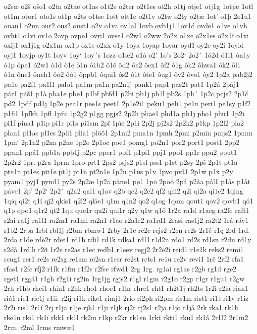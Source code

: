 o2sæ
o2š
ošo1
o2ta
o2tae
ot1as
o1t2e
o2ter
o2t1es
ot2h
o1tj
otje1
otj1g
1otjæ
1otl
ot1m
otor1
oto1s
ot1p
o2ts
o1tse
1ott
ott1e
o2t1v
o2tw
o2ty
o2tæ
1ot'
o1þ
2o1u1
ouan1
o2un
our2
ous2
oust1
o2v
o1va
ov1al
1ovb
ovb1j1
1ov1d
ovde1
o1ve
o1vh
ovht1
o1vi
ov1o
2ovp
ovpe1
ovri1
ovse1
o2w1
o2ww
2o2x
o1xe
o2x1es
o2x1f
o1xi
oxij1
ox1j1g
o2x1m
ox1p
ox1s
o2xx
o1y
1oya
1oyap
1oyar
oyd1
oy2e
oy2i
1oyid
oyj1
1oyjp
oy1t
1oyv
1oy`
1oy´s
1ozz
o1æ2
o1å
o2'
1o's
2o2`
2o2´
1ó2d
ó1i1
ón1y
ó1p
ópe1
ó2w1
ò1d
ò1e
ò1n
ô1b2
ô1č
ôd2
ôe2
ôex1
ôf2
ô1g
ôh2
ôhwa1
ôk2
ôl1
ô1n
ône1
ôneh1
ôo2
ôó1
ôppb1
ôqui1
ôs2
ô1t
ôte1
ôug1
ôv2
ôvo1
ôy2
1p2a
pab2j2
pa1e
pa2f1
pa1l1
palo1
pa1m
pa1n
pa2n1j
pank1
pap1
pas2t
pat1
1p2á
2páj1
pár1
páš1
p1à
pba1e
pbe1
p1bf
pbfd1
p2bi
pb1j
pb1l
pb2s
1pb´
1p2c
pcjs2
2p1č
pd2
1pdf
pd1j
1p2e
pea1r
pee1s
peet1
2p1e2i1
peku1
peli1
pe1n
peri1
pe1sy
p1f2
p1fi1
1pfkh
1pfl
1pfu
1p2g2
p1gg
pgjs2
2p2h
phae1
phd1a
ph1j
pho1
phu1
1p2i
pi1f
pina1
p1ip
pi1r
pi1s
pi1sm
2pï
1pïe
2p1í
2p2j
pj2s2
2p2k2
p1kp
1p2l2
pla2
plan1
pl1as
pl1es
2pli1
plia1
plöö1
2p1m2
pma1n
1pmh
2pmi
p2min
pmjs2
1pmm
1pm`
2p1n2
p2na
p2ne
1p2o
2p1oc
poe1
pomg1
po2n1
por2
port1
post1
2pp2
ppan1
ppá1
ppb1a
ppb1j
p2pc
pper1
ppf1
p1pi1
ppj1
ppo1
pp1r
ppu2
pput1
2p2r2
1pr.
p2ra
1prm
1pro
prt1
2ps2
psjs2
p1sl
pss1
p1st
p2sy
2pš
2p1t
pt1a
pte1n
pt1es
pti1e
pt1j
pt1n
pt2n1e
1p2u
p1us
p1v
1pvc
pvå1
2p1w
p1x
p2y
pyam1
pyj1
pynd1
py2s
2p2æ
1p2ä
päne1
pø1
1pö
2pöö
2på
p2åa
pål1
p1ås
p1åt
påve1
2p'
2p2`
2p2´
q2a2
qai1
q1av
q2b
qc2
q2e2
qf2
qhi2
q2i
qi2a
qi1e2
1qing
1qiq
qi2t
q1í
qj2
qkis1
q2l2
qlåe1
q1m
q1n2
qo2
q1og
1qom
qout1
qov2
qovb1
qó1
q1p
qpo1
q1r2
qt2
1qu
que1r
qu2i
qui1r
q2v
q1w
q1ö
1r2a
ra1d
r1aeg
ra2fe
raft1
r2ai
ra1j
ra1l1
ra2m1
ra1ml
ra2n1
r1ao
r2a1r2
ra1rd1
2rasi
ras1j2
ra2t2
1rá
ráv1
r1b2
2rba
1rbl
rbl1j
r2bm
rbmw1
2rby
2r1c
rc2c
rcjs2
r2cn
rc2s
2r1č
r1ç
2rd
1rd.
2rda
r1de
rde2r
rdet1
rd1h
rdi1
rd1k
rdka1
rd1l
r1d2n
rdo1
rd2s
rd1sn
r2du
rd1y
r2då
1rd'h
r2ð
1r2e
re2as
r1ec
redb1
r1eev
regj2
2r2e2i
reid1
r1e1k
reks2
remi1
reng1
rer1
re2s
re2sg
re1sm
re2sn
r1esr
re2st
rets1
re1u
re2v
revi1
1rê
2rf2
rfa1
rfas1
r2fc
rfj2
r1fk
r1fm
r1f2s
r2fse
rfwd1
2rg
1rg.
rg1ai
rg1as
r2gb
rg1d
rge2
rget1
rggá1
r1gh
r2g1i
rg2in
1rg1jg
rgjs2
r1gl
r1gm
r2g1o
r2gp
r1gr
r1gu1
r2gw
2rh
r1hb
rhei1
rhin1
r2hk
rho1
rhoe1
r1hr
rhrc1
rht1
rh2t1j
rh2ts
1r2i
r2ia
rian1
riá1
rie1
rie1j
r1ii.
r2ij
ri1k
rike1
rimj1
2rio
ri2ph
ri2pm
ris1m
rist1
ri1t
ri1v
r1iz
2r2ï
rïs1
2r1í
2rj
r1ja
r1je
rjh1
r1ji
r1jk
rj2r
rj2s1
r2jä
r1jö
r1jå
2rk
rka1
rk1b
rke1n
rki1
rk1ï
rkk1
rk1l
rk2m
r1kp
r2kr
rk1sn
1rkt
rkti1
rku1
rk1å
2r1l2
2r1m2
2rm.
r2ml
1rms
rmwæ1

